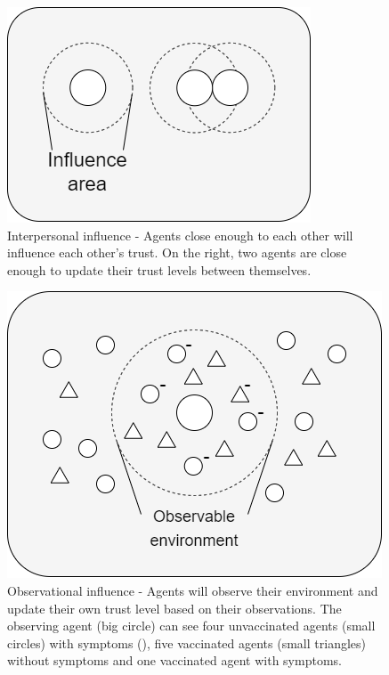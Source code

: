 \begin{figure}[!htb]
    \centering
        \includegraphics[width=\linewidth]{pics/interpersonal.drawio.png}
    \endminipage
    \caption{Interpersonal influence - Agents close enough to each other will influence each other's trust. On the right, two agents are close enough to update their trust levels between themselves.}
    \label{fig:interpersonal_influence}
\end{figure}
\begin{figure}[!htb]
    \centering
        \includegraphics[width=\linewidth]{pics/observational.drawio.png}
    \endminipage
    \caption{Observational influence - Agents will observe their environment and update their own trust level based on their observations. The observing agent (big circle) can see four unvaccinated agents (small circles) with symptoms (), five vaccinated agents (small triangles) without symptoms and one vaccinated agent with symptoms.}
    \label{fig:observational_influence}
\end{figure}

